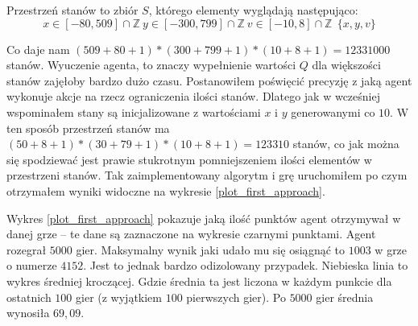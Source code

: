 \documentclass[a4paper, 12pt,oneside]{book}
\begin{document}
Przestrzeń stanów to zbiór $S$, którego elementy wyglądają następująco:
\[x \in [-80, 509] \cap \mathbb{Z} \ y \in [-300,799] \cap
\mathbb{Z} \ v \in [-10,8] \cap \mathbb{Z}\ \  \{x, y, v\}\]

Co daje nam $(509 + 80 + 1) * (300 + 799 + 1) * (10 + 8 +1) = 12 331 000$
stanów. Wyuczenie agenta, to znaczy wypełnienie wartości $Q$ dla większości
stanów zajęłoby bardzo dużo czasu. Postanowiłem poświęcić precyzję z jaką agent
wykonuje akcje na rzecz ograniczenia ilości stanów. Dlatego jak w wcześniej
wspominałem stany są inicjalizowane z wartościami $x$ i $y$ generowanymi co
$10$. W ten sposób przestrzeń stanów ma $(50 + 8 + 1) * (30 + 79 + 1) * (10 + 8
+ 1) = 123 310$ stanów, co jak można się spodziewać jest prawie stukrotnym
pomniejszeniem ilości elementów w przestrzeni stanów. Tak zaimplementowany 
algorytm i grę uruchomiłem po czym otrzymałem wyniki
widoczne na wykresie \ref{plot_first_approach}.

Wykres \ref{plot_first_approach} pokazuje jaką ilość punktów agent otrzymywał w
danej grze -- te dane są zaznaczone na wykresie czarnymi punktami. Agent
rozegrał $5000$ gier. Maksymalny wynik jaki udało mu się osiągnąć to $1003$ w
grze o numerze $4152$. Jest to jednak bardzo odizolowany przypadek. Niebieska
linia to wykres średniej kroczącej. Gdzie średnia ta jest liczona w każdym
punkcie dla ostatnich $100$ gier (z wyjątkiem $100$ pierwszych gier). Po $5000$
gier średnia wynosiła $69,09$.
\end{document}
